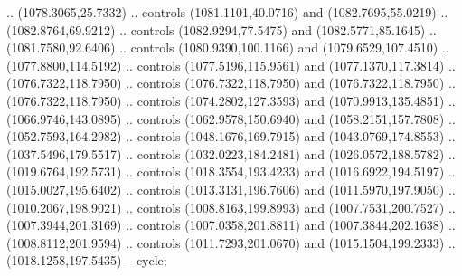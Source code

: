 \begin{scope}[shift={(-127.26916,-608.18524)}]
\begin{scope}
\begin{scope}[shift={(-190.60299,773.9938)},opacity=0.500,transparency group]
        .. (1078.3065,25.7332) .. controls (1081.1101,40.0716) and (1082.7695,55.0219)
        .. (1082.8764,69.9212) .. controls (1082.9294,77.5475) and (1082.5771,85.1645)
        .. (1081.7580,92.6406) .. controls (1080.9390,100.1166) and
        (1079.6529,107.4510) .. (1077.8800,114.5192) .. controls (1077.5196,115.9561)
        and (1077.1370,117.3814) .. (1076.7322,118.7950) .. controls
        (1076.7322,118.7950) and (1076.7322,118.7950) .. (1076.7322,118.7950) ..
        controls (1074.2802,127.3593) and (1070.9913,135.4851) .. (1066.9746,143.0895)
        .. controls (1062.9578,150.6940) and (1058.2151,157.7808) ..
        (1052.7593,164.2982) .. controls (1048.1676,169.7915) and (1043.0769,174.8553)
        .. (1037.5496,179.5517) .. controls (1032.0223,184.2481) and
        (1026.0572,188.5782) .. (1019.6764,192.5731) .. controls (1018.3554,193.4233)
        and (1016.6922,194.5197) .. (1015.0027,195.6402) .. controls
        (1013.3131,196.7606) and (1011.5970,197.9050) .. (1010.2067,198.9021) ..
        controls (1008.8163,199.8993) and (1007.7531,200.7527) .. (1007.3944,201.3169)
        .. controls (1007.0358,201.8811) and (1007.3844,202.1638) ..
        (1008.8112,201.9594) .. controls (1011.7293,201.0670) and (1015.1504,199.2333)
        .. (1018.1258,197.5435) -- cycle;


\end{scope}
\end{scope}
\end{scope}
